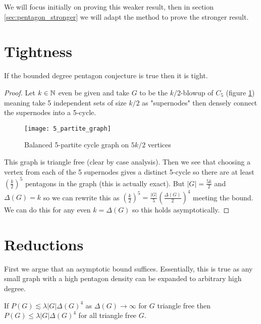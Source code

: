 We will focus initially on proving this weaker result, then in section
\ref{sec:pentagon_stronger} we will adapt the method to prove the stronger
result.

\section{Tightness}

\begin{lemma}
    If the bounded degree pentagon conjecture is true then it is tight.
\end{lemma}

\begin{proof}
    Let $k\in\mathbb{N}$ even be given and take $G$ to be the $k/2$-blowup of $C_5$
    (figure \ref{fig:5_partite_graph}) meaning take 5 independent sets of size $k/2$ as
    "supernodes" then densely connect the supernodes into a 5-cycle.
    \begin{figure}[ht]
        \centering
        \texttt{[image: 5\_partite\_graph]}
        \caption{Balanced 5-partite cycle graph on $5k/2$ vertices}
        \label{fig:5_partite_graph}
    \end{figure}
    This graph is triangle free (clear by case analysis).
    Then we see that choosing
    a vertex from each of the 5 supernodes gives a distinct 5-cycle so there are at
    least $\left(\frac{k}{2}\right)^5$ pentagons in the graph (this is actually exact). But
    $|G|=\frac{5k}{2}$ and $\Delta(G)=k$ so we can rewrite this as
    $\left(\frac{k}{2}\right)^5 = \frac{|G|}{5}\left(\frac{\Delta(G)}{2}\right)^4$ meeting
    the bound. We can do this for any even $k=\Delta(G)$ so this holds asymptotically.
\end{proof}


\section{Reductions}

First we argue that an asymptotic bound suffices. Essentially, this is true as any small
graph with a high pentagon density can be expanded to arbitrary high degree.
\begin{lemma}
    \label{lemma:pentagon_asymp_suffices}
    If $P(G) \lesssim \lambda|G|\Delta(G)^4$ as $\Delta(G)\to\infty$ for
    $G$ triangle free
    then $P(G) \leq \lambda|G|\Delta(G)^4$ for all triangle free $G$.
\end{lemma}

